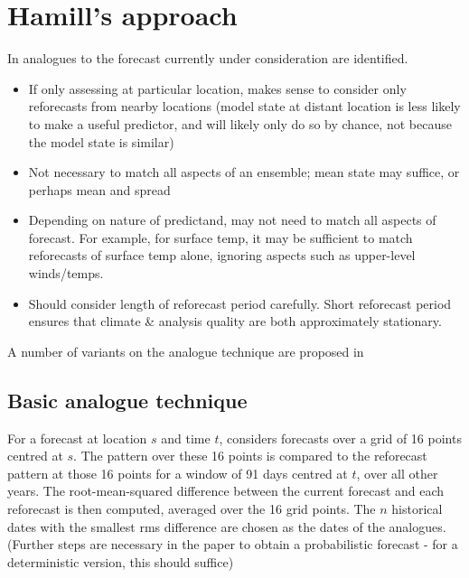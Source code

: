 \documentclass[10pt,fleqn]{article}
\begin{document}
\section{Hamill's approach}
In \cite{Hamill2006} analogues to the forecast currently under consideration are identified.

\begin{itemize}

\item If only assessing at particular location, makes sense to consider only reforecasts from nearby locations (model state at distant location is less likely to make a useful predictor, and will likely only do so by chance, not because the model state is similar)

\item Not necessary to match all aspects of an ensemble; mean state may suffice, or perhaps mean and spread

\item Depending on nature of predictand, may not need to match all aspects of forecast. For example, for surface temp, it may be sufficient to match reforecasts of surface temp alone, ignoring aspects such as upper-level winds/temps.

\item Should consider length of reforecast period carefully. Short reforecast period ensures that climate \& analysis quality are both approximately stationary.

\end{itemize}

A number of variants on the analogue technique are proposed in \cite{Hamill2006}

\subsection{Basic analogue technique}

For a forecast at location $s$ and time $t$, \cite{Hamill2006} considers forecasts over a grid of 16 points centred at $s$. The pattern over these 16 points is compared to the reforecast pattern at those 16 points for a window of 91 days centred at $t$, over all other years. The root-mean-squared difference between the current forecast and each reforecast is then computed, averaged over the 16 grid points. The $n$ historical dates with the smallest rms difference are chosen as the dates of the analogues. (Further steps are necessary in the paper to obtain a probabilistic forecast - for a deterministic version, this should suffice) 
\end{document}

